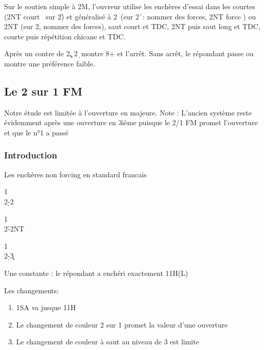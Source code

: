\documentclass[a4paper]{article}
\begin{document}
Sur le soutien simple à 2M, l'ouvreur utilise les enchères d'essai dans les courtes (2NT court \s\ sur 2\h ) et généralisé à 2\s\ (sur 2\h\ : nommer des forces, 2NT force \s ) ou 2NT (sur 2\s , nommer des forces), saut court et TDC, 2NT puis saut long et TDC, courte puis répétition chicane et TDC.

Après un contre de 2\c , 2\d\ montre 8+ et l'arrêt. Sans arrêt, le répondant passe ou montre une préférence faible.

\subsection{Le 2 sur 1 FM}

Notre étude est limitée à l’ouverture en majeure. 
Note : 
L’ancien système reste évidemment après une ouverture en 3ième puisque le 2/1 FM promet 
l’ouverture et que le n°1 a passé

\subsubsection{Introduction}

Les enchères non forcing en standard francais

\begin{bidtable}
1\c\\
2\d-2\s
\end{bidtable}

\begin{bidtable}
1\c\\
2\h-2NT
\end{bidtable}

\begin{bidtable}
1\c\\
2\d-3\c
\end{bidtable}

Une constante : le répondant a enchéri exactement 11H(L)

Les changements:

\begin{enumerate}
\item 1SA va jusque 11H

\item Le changement de couleur 2 sur 1 promet la valeur d’une ouverture

\item Le changement de couleur à saut au niveau de 3 est limite

\end{enumerate}
\end{document}
